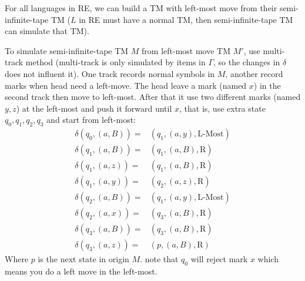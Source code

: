 \documentclass[10pt]{homework}
\begin{document}
\begin{solution}
    For all languages in RE, we can build a TM with left-most move from their semi-infinite-tape TM ($L$ in RE must have a normal TM, then semi-infinite-tape TM can simulate that TM).

    To simulate semi-infinite-tape TM $M$ from left-most move TM $M'$, use multi-track method (multi-track is only simulated by items in $\Gamma$, so the changes in $\delta$ does not influent it). One track records normal symbols in $M$, another record marks when head need a left-move. The head leave a mark (named $x$) in the second track then move to left-most. After that it use two different marks (named $y,z$) at the left-most and push it forward until $x$, that is, use extra state $q_0,q_1,q_2,q_3$ and start from left-most:
    \begin{align}
        \delta\left( q_0,\left( a,B \right)  \right) =&\left( q_1,\left( a,y \right) ,\text{L-Most} \right) \nonumber\\
        \delta\left( q_1,\left( a,B \right)  \right) =&\left( q_1,\left( a,B \right) ,\text{R} \right) \nonumber\\
        \delta\left( q_1,\left( a,z \right)  \right) =&\left( q_1,\left( a,B \right) ,\text{R} \right) \nonumber\\
        \delta\left( q_1,\left( a,y \right)  \right) =&\left( q_2,\left( a,z \right) ,\text{R} \right) \nonumber\\
        \delta\left( q_2,\left( a,B \right)  \right) =&\left( q_1,\left( a,y \right) ,\text{L-Most} \right) \nonumber\\
        \delta\left( q_2,\left( a,x \right)  \right) =&\left( q_3,\left( a,B \right) ,\text{R} \right) \nonumber\\
        \delta\left( q_3,\left( a,B \right)  \right) =&\left( q_3,\left( a,B \right) ,\text{R} \right) \nonumber\\
        \delta\left( q_3,\left( a,z \right)  \right) =&\left( p,\left( a,B \right) ,\text{R} \right) \nonumber
    \end{align}
    Where $p$ is the next state in origin $M$. note that $q_0$ will reject mark $x$ which means you do a left move in the left-most.
\end{solution}
\end{document}
